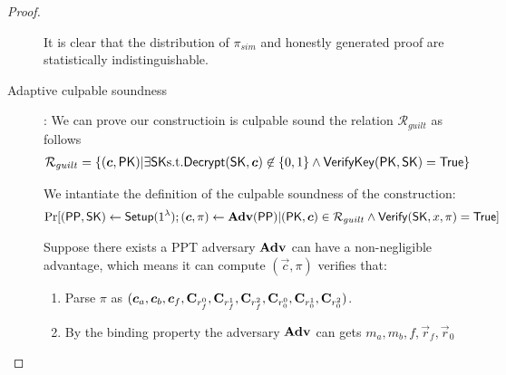 \begin{proof}
\begin{description}
    It is clear that the distribution of $\pi_{sim}$ and honestly generated proof are statistically indistinguishable.
    
  \item[\textsf{Adaptive culpable soundness}]:
    We can prove our constructioin is culpable sound \wrt the relation $\mathcal{R}_{guilt}$ as follows
    \begin{align*}
      \mathcal{R}_{guilt} &= \{(\vec{c}, \PK) | \exists \SK \st \Dec(\SK, \vec{c}) \not \in \{0,1\}  \wedge {\mathsf{VerifyKey}}(\PK, \SK)  = \True\}
    \end{align*}

    We intantiate the definition of the culpable soundness of the construction:
    \begin{align*}
      \Pr[(\PPP, \SK) \gets \Setup(1^{\lambda}); (\vec{c}, \pi) \gets \Adv(\PPP) | (\PK, \vec{c}) \in \mathcal{R}_{guilt} \wedge \Verif(\SK, x, \pi) = \True]
    \end{align*}

    Suppose there exists a PPT adversary $\mathbf{Adv}$ can have a non-negligible advantage, which means it can compute $(\vec{c}, \pi)$ verifies that:
    \begin{enumerate}
    \item Parse $\pi$ as $(\vec{c}_a, \vec{c}_b, \vec{c}_f, \mat{C}_{r_f^0}, \mat{C}_{r_f^1}, \mat{C}_{r_f^2}, \mat{C}_{r_0^0}, \mat{C}_{r_0^1}, \mat{C}_{r_0^2})$.
    \item By the binding property the adversary $\mathbf{Adv}$ can gets $m_a, m_b, f, \vec{r}_f, \vec{r}_0$ 
    \end{enumerate}

    
  \end{description}

\end{proof}

